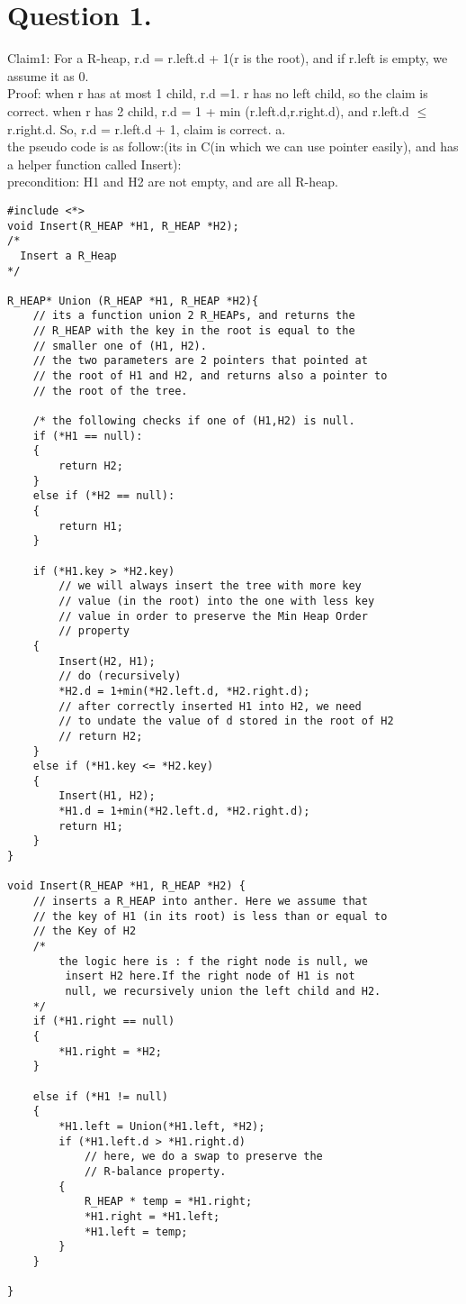 \documentclass{article}
\begin{document}
\section{Question 1.}
Claim1: For a R-heap, r.d = r.left.d + 1(r is the root), and if r.left is empty, we assume it as 0.\\
Proof: when r has at most 1 child, r.d =1. r has no left child, so the claim is correct.
when r has 2 child, r.d = 1 + min (r.left.d,r.right.d), and r.left.d $\leq$ r.right.d. So, r.d = r.left.d + 1, claim is correct.
a.\\
the pseudo code is as follow:(its in C(in which we can use pointer easily), and has a helper
function called Insert):\\
precondition: H1 and H2 are not empty, and are all R-heap. 
\begin{lstlisting}
#include <*>
void Insert(R_HEAP *H1, R_HEAP *H2);
/*
  Insert a R_Heap 
*/

R_HEAP* Union (R_HEAP *H1, R_HEAP *H2){
	// its a function union 2 R_HEAPs, and returns the 
	// R_HEAP with the key in the root is equal to the 
	// smaller one of (H1, H2).
	// the two parameters are 2 pointers that pointed at 
	// the root of H1 and H2, and returns also a pointer to 
	// the root of the tree.
	
	/* the following checks if one of (H1,H2) is null.	
	if (*H1 == null):
	{
		return H2;
	}
	else if (*H2 == null):
	{
		return H1;
	}
	
	if (*H1.key > *H2.key)
		// we will always insert the tree with more key
		// value (in the root) into the one with less key
		// value in order to preserve the Min Heap Order
		// property
	{
		Insert(H2, H1);
		// do (recursively) 
		*H2.d = 1+min(*H2.left.d, *H2.right.d);
		// after correctly inserted H1 into H2, we need 
		// to undate the value of d stored in the root of H2
		// return H2;
	}
	else if (*H1.key <= *H2.key)
	{
		Insert(H1, H2);
		*H1.d = 1+min(*H2.left.d, *H2.right.d);
		return H1;
	}
}

void Insert(R_HEAP *H1, R_HEAP *H2) {
	// inserts a R_HEAP into anther. Here we assume that 
	// the key of H1 (in its root) is less than or equal to 
	// the Key of H2
	/*
		the logic here is : f the right node is null, we
		 insert H2 here.If the right node of H1 is not 
		 null, we recursively union the left child and H2.
	*/
	if (*H1.right == null)
	{
		*H1.right = *H2;
	}
	
	else if (*H1 != null)
	{
		*H1.left = Union(*H1.left, *H2);
		if (*H1.left.d > *H1.right.d)
			// here, we do a swap to preserve the 
			// R-balance property.
		{
			R_HEAP * temp = *H1.right;
			*H1.right = *H1.left;
			*H1.left = temp;
		}
	}
	
}

\end{lstlisting}
\end{document}
